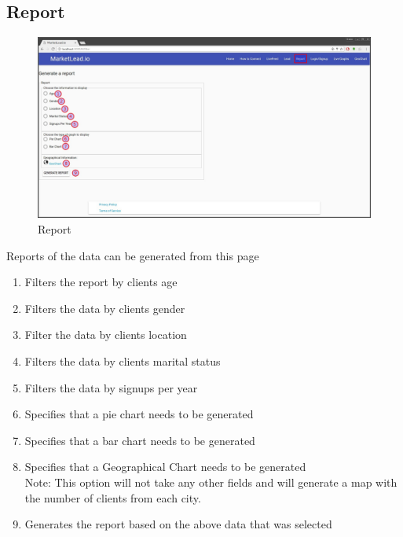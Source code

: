 \documentclass{article}
\begin{document}
		\subsection{Report}
			\begin{figure}[H]
				\includegraphics[widt=\textwidth]{images/report.jpg}
				\caption{Report}
			\end{figure}
			Reports of the data can be generated from this page
			\begin{enumerate}
				\item Filters the report by clients age
				\item Filters the data by clients gender
				\item Filter the data by clients location
				\item Filters the data by clients marital status
				\item Filters the data by signups per year
				\item Specifies that a pie chart needs to be generated
				\item Specifies that a bar chart needs to be generated
				\item Specifies that a Geographical Chart needs to be generated\\
					Note: This option will not take any other fields and will generate a map with the number of clients from each city.
				\item Generates the report based on the above data that was selected
			\end{enumerate}
\end{document}
